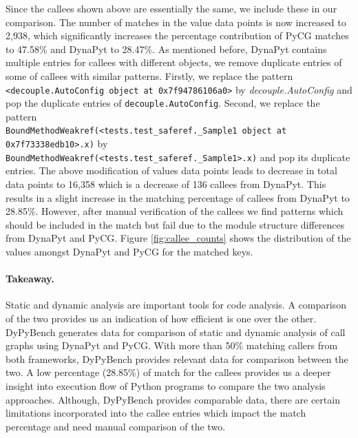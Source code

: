 Since the callees shown above are essentially the same, we include these in our comparison.
The number of matches in the value data points is now increased to 2,938, which significantly increases the percentage contribution of PyCG matches to 47.58\% and DynaPyt to 28.47\%.
As mentioned before, DynaPyt contains multiple entries for callees with different objects, we remove duplicate entries of some of callees with similar patterns.
Firstly, we replace the pattern \verb|<decouple.AutoConfig object at 0x7f94786106a0>| by \textit{decouple.AutoConfig} and pop the duplicate entries of \verb|decouple.AutoConfig|.
Second, we replace the pattern \\\verb|BoundMethodWeakref(<tests.test_saferef._Sample1 object at 0x7f73338edb10>.x)| by \\\verb|BoundMethodWeakref(<tests.test_saferef._Sample1>.x)| and pop its duplicate entries.
The above modification of values data points leads to decrease in total data points to 16,358 which is a decrease of 136 callees from DynaPyt.
This results in a slight increase in the matching percentage of callees from DynaPyt to 28.85\%.
However, after manual verification of the callees we find patterns which should be included in the match but fail due to the module structure differences from DynaPyt and PyCG.
Figure \ref{fig:callee_counts} shows the distribution of the values amongst DynaPyt and PyCG for the matched keys.

\paragraph{Takeaway.} Static and dynamic analysis are important tools for code analysis.
A comparison of the two provides us an indication of how efficient is one over the other.
DyPyBench generates data for comparison of static and dynamic analysis of call graphs using DynaPyt and PyCG.
With more than 50\% matching callers from both frameworks, DyPyBench provides relevant data for comparison between the two.
A low percentage (28.85\%) of match for the callees provides us a deeper insight into execution flow of Python programs to compare the two analysis approaches.
Although, DyPyBench provides comparable data, there are certain limitations incorporated into the callee entries which impact the match percentage and need manual comparison of the two.
